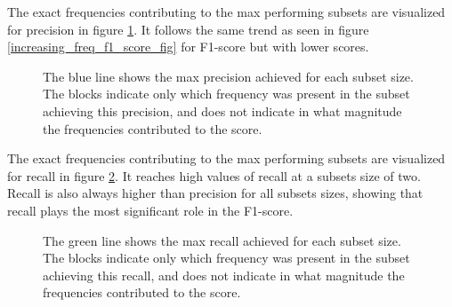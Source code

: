     The exact frequencies contributing to the max performing subsets are visualized for precision in figure \ref{increasing_freq_precision_score_fig}. It follows the same trend as seen in figure \ref{increasing_freq_f1_score_fig} for F1-score but with lower scores.

        \begin{figure}[H]
            \centering
            
            \caption[Best frequency combination - Precision]{The blue line shows the max precision achieved for each subset size. The blocks indicate only which frequency was present in the subset achieving this precision, and does not indicate in what magnitude the frequencies contributed to the score.}
          	\medskip 
            \label{increasing_freq_precision_score_fig}
        \end{figure}
        
    The exact frequencies contributing to the max performing subsets are visualized for recall in figure \ref{increasing_freq_recall_score_fig}. It reaches high values of recall at a subsets size of two. Recall is also always higher than precision for all subsets sizes, showing that recall plays the most significant role in the F1-score.
    
    
        \begin{figure}[H]
            \centering
            
            \caption[Best frequency combination - Recall]{The green line shows the max recall achieved for each subset size. The blocks indicate only which frequency was present in the subset achieving this recall, and does not indicate in what magnitude the frequencies contributed to the score.}
          	\medskip 
            \label{increasing_freq_recall_score_fig}
        \end{figure}

